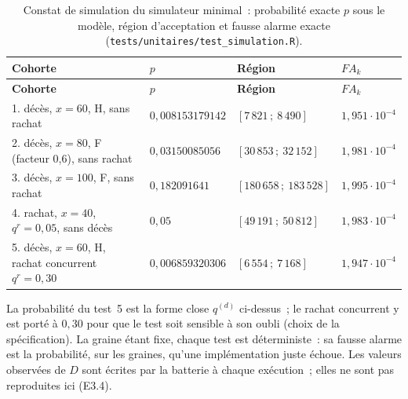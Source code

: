 \documentclass[a4paper,11pt]{article}
\newcommand{\code}[1]{\texttt{\small #1}}
\begin{document}
{\small
{}
\begin{longtable}{@{}p{6.2cm}p{2.6cm}p{3.4cm}p{2.2cm}@{}}
\caption{Constat de simulation du simulateur minimal~: probabilité exacte $p$
sous le modèle, région d'acceptation et fausse alarme exacte
(\code{tests/unitaires/test\_simulation.R}).}
\label{tab:constat-simulation}\\
\rowcolor{tableheader}
\textcolor{financeblue}{\textbf{Cohorte}} &
\textcolor{financeblue}{\textbf{$p$}} &
\textcolor{financeblue}{\textbf{Région}} &
\textcolor{financeblue}{\textbf{$FA_k$}} \\
\endfirsthead
\rowcolor{tableheader}
\textcolor{financeblue}{\textbf{Cohorte}} &
\textcolor{financeblue}{\textbf{$p$}} &
\textcolor{financeblue}{\textbf{Région}} &
\textcolor{financeblue}{\textbf{$FA_k$}} \\
\endhead
1. décès, $x = 60$, H, sans rachat & $0{,}008153179142$ & $[7\,821\,;\ 8\,490]$ & $1{,}951\cdot 10^{-4}$ \\
2. décès, $x = 80$, F (facteur 0,6), sans rachat & $0{,}03150085056$ & $[30\,853\,;\ 32\,152]$ & $1{,}981\cdot 10^{-4}$ \\
3. décès, $x = 100$, F, sans rachat & $0{,}182091641$ & $[180\,658\,;\ 183\,528]$ & $1{,}995\cdot 10^{-4}$ \\
4. rachat, $x = 40$, $q^{r} = 0{,}05$, sans décès & $0{,}05$ & $[49\,191\,;\ 50\,812]$ & $1{,}983\cdot 10^{-4}$ \\
5. décès, $x = 60$, H, rachat concurrent $q^{r} = 0{,}30$ & $0{,}006859320306$ & $[6\,554\,;\ 7\,168]$ & $1{,}947\cdot 10^{-4}$ \\
\end{longtable}
}

\noindent
La probabilité du test~5 est la forme close $q^{(d)}$ ci-dessus~; le rachat
concurrent y est porté à $0{,}30$ pour que le test soit sensible à son oubli
(choix de la spécification). La graine étant fixe, chaque test est
déterministe~: sa fausse alarme est la probabilité, sur les graines, qu'une
implémentation juste échoue. Les valeurs observées de $D$ sont écrites par la
batterie à chaque exécution~; elles ne sont pas reproduites ici (E3.4).
\end{document}
